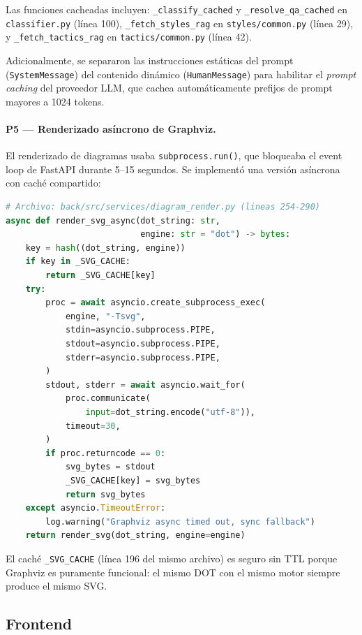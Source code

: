 \documentclass[12pt, letterpaper, oneside]{article}
\begin{document}
Las funciones cacheadas incluyen: \texttt{\_classify\_cached} y
\texttt{\_resolve\_qa\_cached} en \texttt{classifier.py} (línea 100),
\texttt{\_fetch\_styles\_rag} en \texttt{styles/common.py} (línea 29), y
\texttt{\_fetch\_tactics\_rag} en \texttt{tactics/common.py} (línea 42).

Adicionalmente, se separaron las instrucciones estáticas del prompt
(\texttt{SystemMessage}) del contenido dinámico (\texttt{HumanMessage}) para
habilitar el \emph{prompt caching} del proveedor LLM, que cachea automáticamente
prefijos de prompt mayores a 1024 tokens.

\paragraph{P5 --- Renderizado asíncrono de Graphviz.}
El renderizado de diagramas usaba \texttt{subprocess.run()}, que bloqueaba el
event loop de FastAPI durante 5--15 segundos. Se implementó una versión asíncrona
con caché compartido:

\begin{lstlisting}[language=Python,
  caption={Renderizado asíncrono de Graphviz con caché},
  label={lst:render-async},
  firstnumber=254]
# Archivo: back/src/services/diagram_render.py (lineas 254-290)
async def render_svg_async(dot_string: str,
                           engine: str = "dot") -> bytes:
    key = hash((dot_string, engine))
    if key in _SVG_CACHE:
        return _SVG_CACHE[key]
    try:
        proc = await asyncio.create_subprocess_exec(
            engine, "-Tsvg",
            stdin=asyncio.subprocess.PIPE,
            stdout=asyncio.subprocess.PIPE,
            stderr=asyncio.subprocess.PIPE,
        )
        stdout, stderr = await asyncio.wait_for(
            proc.communicate(
                input=dot_string.encode("utf-8")),
            timeout=30,
        )
        if proc.returncode == 0:
            svg_bytes = stdout
            _SVG_CACHE[key] = svg_bytes
            return svg_bytes
    except asyncio.TimeoutError:
        log.warning("Graphviz async timed out, sync fallback")
    return render_svg(dot_string, engine=engine)
\end{lstlisting}

El caché \texttt{\_SVG\_CACHE} (línea 196 del mismo archivo) es seguro sin TTL
porque Graphviz es puramente funcional: el mismo DOT con el mismo motor siempre
produce el mismo SVG.


\subsection{Frontend}
\label{subsec:frontend}
\end{document}
